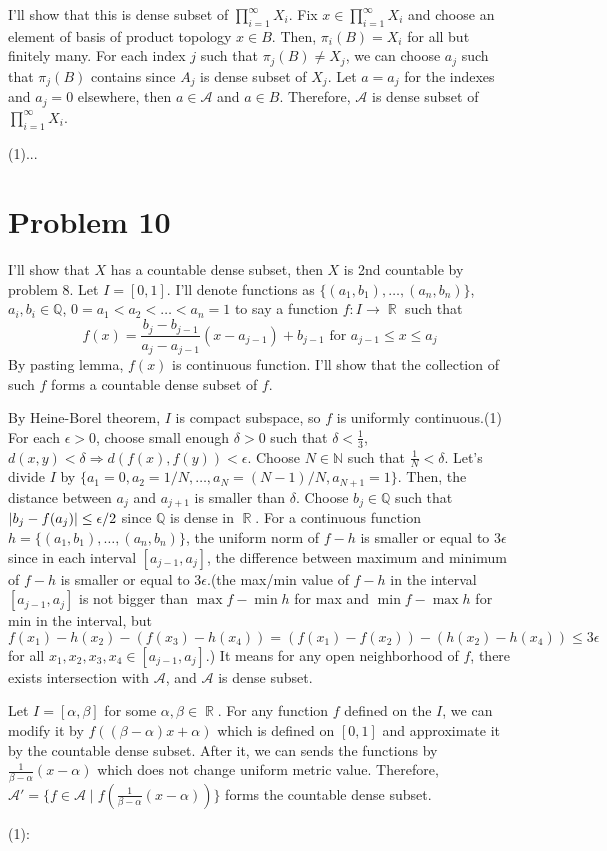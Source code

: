 \documentclass{article}
\DeclareMathOperator{\rr}{\mathbb{R}}
\begin{document}
I'll show that this is dense subset of $\prod_{i=1}^\infty X_i$. Fix $x\in\prod_{i=1}^\infty X_i$ and choose an element of basis of product topology $x\in B$. Then, $\pi_i(B)=X_i$ for all but finitely many. For each index $j$ such that $\pi_j(B)\neq X_j$, we can choose $a_j$ such that $\pi_j(B)$ contains since $A_j$ is dense subset of $X_j$. Let $a=a_j$ for the indexes and $a_j=0$ elsewhere, then $a\in \mathcal{A}$ and $a\in B$. Therefore, $\mathcal{A}$ is dense subset of $\prod_{i=1}^\infty X_i$.

(1)...
\section*{Problem 10}
I'll show that $X$ has a countable dense subset, then $X$ is 2nd countable by problem 8. Let $I=[0, 1]$. I'll denote functions as $\{(a_1, b_1), \ldots, (a_n, b_n)\}$, $a_i, b_i\in \mathbb{Q}$, $0=a_1<a_2<\ldots<a_n=1$ to say a function $f:I\rightarrow\rr$ such that
\begin{equation*}
f(x)=\frac{b_j-b_{j-1}}{a_j-a_{j-1}}(x-a_{j-1})+b_{j-1}\text{ for }a_{j-1}\leq x\leq a_{j}
\end{equation*}
By pasting lemma, $f(x)$ is continuous function. I'll show that the collection of such $f$ forms a countable dense subset of $f$.

By Heine-Borel theorem, $I$ is compact subspace, so $f$ is uniformly continuous.(1) For each $\epsilon>0$, choose small enough $\delta>0$ such that $\delta<\frac{1}{3}$, $d(x,y)<\delta\Rightarrow d(f(x),f(y))<\epsilon$. Choose $N\in \mathbb{N}$ such that $\frac{1}{N}<\delta$. Let's divide $I$ by $\{a_1=0, a_2=1/N, \ldots, a_{N}=(N-1)/N, a_{N+1}=1\}$. Then, the distance between $a_j$ and $a_{j+1}$ is smaller than $\delta$. Choose $b_j\in \mathbb{Q}$ such that $\abs{b_j-f(a_j)}\leq \epsilon/2$ since $\mathbb{Q}$ is dense in $\rr$. For a continuous function $h=\{(a_1, b_1), \ldots, (a_n, b_n)\}$, the uniform norm of $f-h$ is smaller or equal to $3\epsilon$ since in each interval $[a_{j-1}, a_j]$, the difference between maximum and minimum of $f-h$ is smaller or equal to $3\epsilon$.(the max/min value of $f-h$ in the interval $[a_{j-1}, a_j]$ is not bigger than $\max f-\min h$ for max and $\min f-\max h$ for min in the interval, but $f(x_1)-h(x_2)-(f(x_3)-h(x_4))=(f(x_1)-f(x_2))-(h(x_2)-h(x_4))\leq 3\epsilon$ for all $x_1, x_2, x_3, x_4\in [a_{j-1}, a_j]$.) It means for any open neighborhood of $f$, there exists intersection with $\mathcal{A}$, and $\mathcal{A}$ is dense subset.

Let $I=[\alpha, \beta]$ for some $\alpha,\beta\in \rr$. For any function $f$ defined on the $I$, we can modify it by $f((\beta-\alpha)x+\alpha)$ which is defined on $[0,1]$ and approximate it by the countable dense subset. After it, we can sends the functions by $\frac{1}{\beta-\alpha}(x-\alpha)$ which does not change uniform metric value. Therefore, $\mathcal{A}'=\{f\in \mathcal{A}\mid f(\frac{1}{\beta-\alpha}(x-\alpha))\}$ forms the countable dense subset.

(1):
\end{document}
